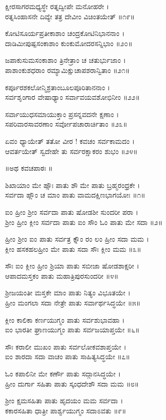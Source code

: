ಕ್ಷೀರಸಾಗರಮಧ್ಯಸ್ಥೇ ರತ್ನದ್ವೀಪೇ ಮನೋಹರೇ ।\\
ರತ್ನಸಿಂಹಾಸನೇ ದಿವ್ಯೇ ತತ್ರ ದೇವೀಂ ವಿಚಿಂತಯೇತ್ ॥೧೯॥

ಕೋಟಿಸೂರ್ಯಪ್ರತೀಕಾಶಾಂ ಚಂದ್ರಕೋಟಿನಿಭಾನನಾಂ ।\\
ದಾಡಿಮೀಪುಷ್ಪಸಂಕಾಶಾಂ ಕುಂಕುಮೋದರಸನ್ನಿಭಾಂ ॥೨೦॥

ಜಪಾಕುಸುಮಸಂಕಾಶಾಂ ತ್ರಿನೇತ್ರಾಂ ಚ ಚತುರ್ಭುಜಾಂ ।\\
ಪಾಶಾಂಕುಶಧರಾಂ ರಮ್ಯಾಮಿಕ್ಷುಚಾಪಶರಾನ್ವಿತಾಂ ॥೨೧॥

ಕರ್ಪೂರಶಕಲೋನ್ಮಿಶ್ರತಾಂಬೂಲಪೂರಿತಾನನಾಂ ।\\
ಸರ್ವಶೃಂಗಾರ ವೇಷಾಢ್ಯಾಂ ಸರ್ವಾವಯವಶೋಭಿನೀಂ ॥೨೨॥

ಸರ್ವಾಯುಧಸಮಾಯುಕ್ತಾಂ ಪ್ರಸನ್ನವದನೇ ಕ್ಷಣಾಂ ।\\
ಸಪರಿವಾರಸಾವರಣಾಂ ಸರ್ವೋಪಚಾರಾರ್ಚಿತಾಂ ॥೨೩॥

ಏವಂ ಧ್ಯಾಯೇತ್ ತತೋ ವೀರ ! ಕವಚಂ ಸರ್ವಕಾಮದಂ ।\\
ಆವರ್ತಯೇತ್ ಸ್ವದೇಹೇ ತು ಸರ್ವರಕ್ಷಾಕರಂ ಶುಭಂ ॥೨೪॥

॥ಅಥ ಕವಚಪಾಠಃ ॥

ಶಿಖಾಯಾಂ ಮೇ ಹ್ಸೌಃ ಪಾತು ಶೌ ಮೇ ಪಾತು ಬ್ರಹ್ಮರಂಧ್ರಕೇ ।\\
ಸರ್ವದಾ ಹ್ಲೌಂ ಚ ಮಾಂ ಪಾತು ವಾಮದಕ್ಷಿಣಭಾಗಯೋಃ ॥೧॥

ಐಂ ಹ್ರೀಂ ಶ್ರೀಂ ಸರ್ವದಾ ಪಾತು ಷೋಡಶೀ ಸುಂದರೀ ಪರಾ ।\\
ಶ್ರೀಂ ಹ್ರೀಂ ಕ್ಲೀಂ ಸರ್ವದಾ ಪಾತು ಐಂ ಸೌಂ ಓಂ ಪಾತು ಮೇ ಸದಾ ॥೨॥

ಹ್ರೀಂ ಶ್ರೀಂ ಐಂ ಪಾತು ಸರ್ವತ್ರ ಕ್ನೌಂ ರಂ ಲಂ ಹ್ರೀಂ ಸದಾ ಮಮ ।\\
ಕ್ಲೀಂ ಹಸಕಹಲಹ್ರೀಂ ಮೇ ಪಾತು ಸದಾ ಸೌಃ ಕ್ಲೀಂ ಮಮ ॥೩॥

ಸೌಃ ಐಂ ಕ್ಲೀಂ ಹ್ರೀಂ ಶ್ರಿಯಾ ಪಾತು ಸಬೀಜಾ ಷೋಡಶಾಕ್ಷರೀ ।\\
ಆಪಾದಮಸ್ತಕಂ ಪಾತು ಮಹಾತ್ರಿಪುರಸುಂದರೀ ॥೪॥

ಶ್ರೀಜಯಂತೀ ಮಸ್ತಕೇ ಮಾಂ ಪಾತು ನಿತ್ಯಂ ವಿಭೂತಯೇ ।\\
ಹ್ರೀಂ ಮಂಗಲಾ ಸದಾ ನೇತ್ರೇ ಪಾತು ಸರ್ವಾರ್ಥಸಿದ್ಧಯೇ ॥೫॥

ಕ್ಲೀಂ ಕಾಲಿಕಾ ಕರ್ಣಯುಗ್ಮಂ ಪಾತು ಸರ್ವಶುಭಾವಹಾ ।\\
ಐಂ ಭಾರತೀ ಘ್ರಾಣಯುಗ್ಮಂ ಪಾತು ಸರ್ವಜಯಾಪ್ತಯೇ ॥೬॥

ಸೌಃ ಕರಾಲೀ ಮುಖಂ ಪಾತು ಸರ್ವಲೋಕವಶಾಪ್ತಯೇ ।\\
ಐಂ ಶಾರದಾ ಸದಾ ವಾಚಂ ಪಾತು ಸಾಹಿತ್ಯಸಿದ್ಧಯೇ ॥೭॥

ಓಂ ಕಪಾಲಿನೀ ಮೇ ಕರ್ಣೌ ಪಾತು ಸದ್ಗಾನಸಿದ್ಧಯೇ ।\\
ಹ್ರೀಂ ದುರ್ಗಾ ಸಹಿತಾ ಪಾತು ಸ್ಕಂಧದೇಶೌ ಸದಾ ಮಮ ॥೮॥

ಶ್ರೀಂ ಕ್ಷಮಸಹಿತಾ ಪಾತು ಹೃದಯಂ ಮಮ ಸರ್ವದಾ ।\\
ಕಕಾರಸಹಿತಾ ಧಾತ್ರೀ ಪಾರ್ಶ್ವಯುಗ್ಮಂ ಸದಾಽವತು ॥೯॥

